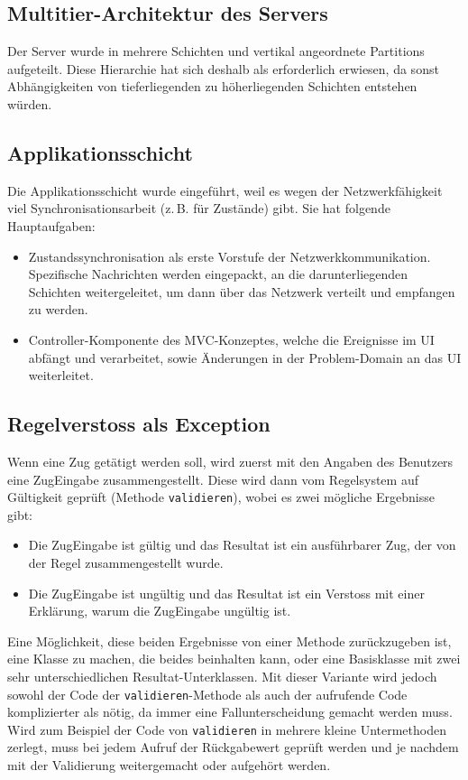 \documentclass[12pt,halfparskip]{scrartcl}
\begin{document}
\subsection{Multitier-Architektur des Servers}
Der Server wurde in mehrere Schichten und vertikal angeordnete Partitions aufgeteilt. Diese Hierarchie hat sich deshalb als erforderlich erwiesen, da sonst Abhängigkeiten von tieferliegenden zu höherliegenden Schichten entstehen würden.

\subsection{Applikationsschicht}
Die Applikationsschicht wurde eingeführt, weil es wegen der Netzwerkfähigkeit viel Synchronisationsarbeit (z.\,B. für Zustände) gibt. Sie hat folgende Hauptaufgaben:
	\begin{itemize}
		\item Zustandssynchronisation als erste Vorstufe der Netzwerkkommunikation. Spezifische Nachrichten werden eingepackt, an die darunterliegenden Schichten weitergeleitet, um dann über das Netzwerk verteilt und empfangen zu werden.
		\item Controller-Komponente des MVC-Konzeptes, welche die Ereignisse im UI abfängt und verarbeitet, sowie Änderungen in der Problem-Domain an das UI weiterleitet.
	\end{itemize}

\subsection{Regelverstoss als Exception}

Wenn eine Zug getätigt werden soll, wird zuerst mit den Angaben des Benutzers eine ZugEingabe zusammengestellt. Diese wird dann vom Regelsystem auf Gültigkeit geprüft (Methode \texttt{validieren}), wobei es zwei mögliche Ergebnisse gibt:
\begin{itemize}
	\item Die ZugEingabe ist gültig und das Resultat ist ein ausführbarer Zug, der von der Regel zusammengestellt wurde.
	\item Die ZugEingabe ist ungültig und das Resultat ist ein Verstoss mit einer Erklärung, warum die ZugEingabe ungültig ist.
\end{itemize}

Eine Möglichkeit, diese beiden Ergebnisse von einer Methode zurückzugeben ist, eine Klasse zu machen, die beides beinhalten kann, oder eine Basisklasse mit zwei sehr unterschiedlichen Resultat-Unterklassen. Mit dieser Variante wird jedoch sowohl der Code der \texttt{validieren}-Methode als auch der aufrufende Code komplizierter als nötig, da immer eine Fallunterscheidung gemacht werden muss. Wird zum Beispiel der Code von \texttt{validieren} in mehrere kleine Untermethoden zerlegt, muss bei jedem Aufruf der Rückgabewert geprüft werden und je nachdem mit der Validierung weitergemacht oder aufgehört werden.
\end{document}
